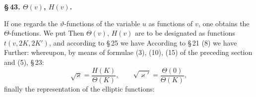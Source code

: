 
\begin{center}
\textbf{\S\,43.  $\Theta(v)$, $H(v)$.}
\end{center}

If one regards the $\vartheta$-functions of the variable $u$ as functions
of $v$, one obtains the  $\Theta$-functions.
We put
Then $\Theta(v)$, $H(v)$ are to be designated as functions $t(v, 2K, 2K')$, and according to \S\,25 we have
According to \S\,21 (8) we have
Further:
whereupon, by means of formulae (3), (10), (15) of the preceding section
and (5), \S\,23:
\[
\sqrt{\varkappa} = \frac{H(K)}{\Theta(K)}, \qquad \sqrt{\varkappa'} = \frac{\Theta(0)}{\Theta(K)},
\]
finally the representation of the elliptic functions:
